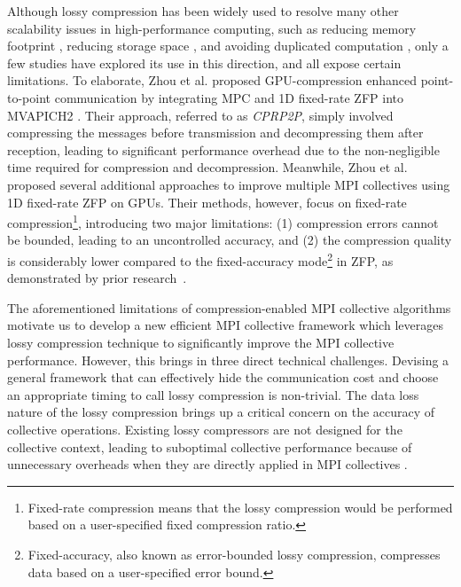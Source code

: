 Although lossy compression has been widely used to resolve many other scalability issues in high-performance computing, such as reducing memory footprint \cite{quant-compression}, reducing storage space \cite{nbody-compression,mdz}, and avoiding duplicated computation \cite{pastri}, only a few studies have explored its use in this direction, and all expose certain limitations. To elaborate, Zhou et al. \cite{Zhou2021GPUCOMPRESSION} proposed GPU-compression enhanced point-to-point communication by integrating MPC \cite{yang2015mpc} and 1D fixed-rate ZFP \cite{Lindstrom2014ZFP} into MVAPICH2 \cite{SHM-MVAPICH2}. Their approach, referred to as \textit{CPRP2P}, simply involved compressing the messages before transmission and decompressing them after reception, leading to significant performance overhead due to the non-negligible time required for compression and decompression. Meanwhile, Zhou et al. \cite{Zhou2022GPUCOMPRESSIONALLTOALL, Zhou2022HiPC} proposed several additional approaches to improve multiple MPI collectives using 1D fixed-rate ZFP \cite{Lindstrom2014ZFP} on GPUs. Their methods, however, focus on fixed-rate compression\footnote{Fixed-rate compression means that the lossy compression would be performed based on a user-specified fixed compression ratio.}, introducing two major limitations: (1) compression errors cannot be bounded, leading to an uncontrolled accuracy, and (2) the compression quality is considerably lower compared to the fixed-accuracy mode\footnote{Fixed-accuracy, also known as error-bounded lossy compression, compresses data based on a user-specified error bound.} in ZFP, as demonstrated by prior research~\cite{fraz, huang2023ccoll}.




The aforementioned limitations of compression-enabled MPI collective algorithms motivate us to develop a new efficient MPI collective framework which leverages lossy compression technique to significantly improve the MPI collective performance. However, this brings in three direct technical challenges.  Devising a general framework that can effectively hide the communication cost and choose an appropriate timing to call lossy compression is non-trivial.
 The data loss nature of the lossy compression brings up a critical concern on the accuracy of collective operations.  Existing lossy compressors are not designed for the collective context, leading to suboptimal collective performance because of unnecessary overheads when they are directly applied in MPI collectives \cite{Di2016SZ, Tao2017SZ, Liang2018SZ, Yu2022SZx, Lindstrom2014ZFP}.


